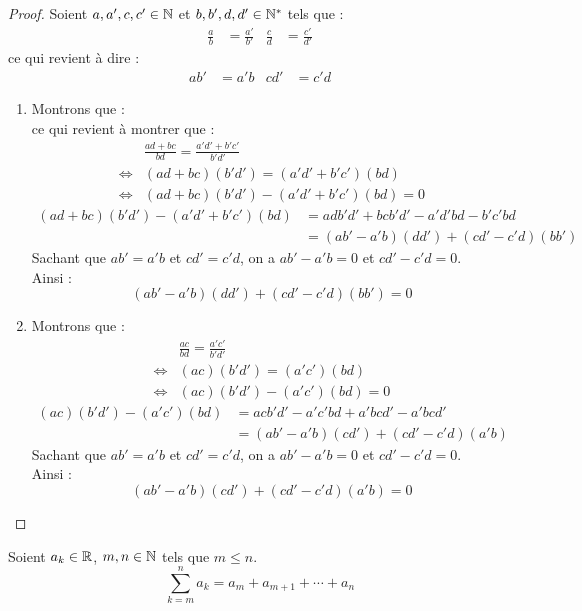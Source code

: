 \begin{proof}
	Soient $a, a', c, c' \in \mathbb{N}$ et $b, b', d, d' \in \mathbb{N}^*$ tels que :
	\begin{align*}
		\frac{a}{b} &= \frac{a'}{b'} & \frac{c}{d} &= \frac{c'}{d'}
	\end{align*}
	ce qui revient à dire :
	\begin{align*}
		ab' &= a'b & cd' &= c'd
	\end{align*}
	\begin{enumerate}
		\item Montrons que :
		\[  \]
		ce qui revient à montrer que :
		\begin{align*}
			&\frac{ad + bc}{bd} = \frac{a'd' + b'c'}{b'd'} \\
			\iff &(ad + bc)(b'd') = (a'd' + b'c')(bd)
			\\
			\iff &(ad + bc)(b'd') - (a'd' + b'c')(bd) = 0
		\end{align*}
		\begin{align*}
			(ad + bc)(b'd') - (a'd' + b'c')(bd) &= adb'd' + bcb'd' - a'd'bd - b'c'bd \\
			&= (ab' - a'b)(dd') + (cd' - c'd)(bb')
		\end{align*}
		Sachant que $ab' = a'b$ et $cd' = c'd$, on a $ab' - a'b = 0$ et $cd' - c'd = 0$.
		\\
		Ainsi :
		\[ (ab' - a'b)(dd') + (cd' - c'd)(bb') = 0 \]
		\item Montrons que :
		\begin{align*}
			&\frac{ac}{bd} = \frac{a'c'}{b'd'} \\
			\iff &(ac)(b'd') = (a'c')(bd) \\
			\iff &(ac)(b'd') - (a'c')(bd) = 0
		\end{align*}
		\begin{align*}
			(ac)(b'd') - (a'c')(bd) &= acb'd' - a'c'bd + a'bcd' - a'bcd' \\
			&= (ab' - a'b)(cd') + (cd' - c'd)(a'b) 
		\end{align*}
		Sachant que $ab' = a'b$ et $cd' = c'd$, on a $ab' - a'b = 0$ et $cd' - c'd = 0$.
		\\
		Ainsi :
		\[ (ab' - a'b)(cd') + (cd' - c'd)(a'b) = 0 \]
	\end{enumerate}
\end{proof}

\begin{definition}[Somme]
    Soient $a_k \in \mathbb{R}$, $m, n \in \mathbb{N}$ tels que $m \leq n$.
    \[ \sum_{k = m}^n a_k = a_m + a_{m + 1} + \cdots + a_n \]
\end{definition}

